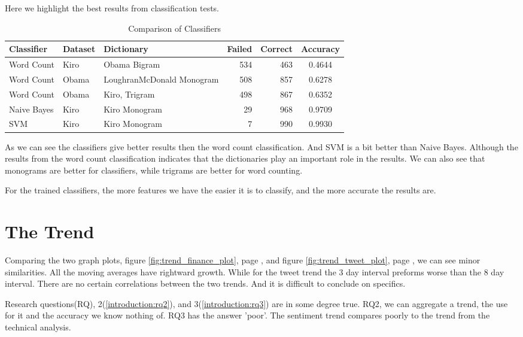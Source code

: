 \begin{table}
\centering
\label{tbl:classification_comparison}
\caption{Comparison of Classifiers}
Here we highlight the best results from classification tests. 
\begin{tabular}{ l l p{3.5cm} r r c }
Classifier & Dataset & Dictionary & Failed & Correct & Accuracy \\
\hline
Word Count & Kiro & Obama Bigram & 534 & 463 & 0.4644 \\
Word Count & Obama & LoughranMcDonald Monogram & 508 & 857 & 0.6278 \\
Word Count & Obama & Kiro, Trigram & 498 & 867 & 0.6352 \\
Naive Bayes & Kiro & Kiro Monogram & 29 & 968 & 0.9709 \\
SVM & Kiro & Kiro Monogram & 7 & 990 & 0.9930 \\
\end{tabular}
\end{table}

As we can see the classifiers give better results then the word count
classification. And SVM is a bit better than Naive Bayes. Although the results
from the word count classification indicates that the dictionaries play an
important role in the results. We can also see that monograms are better for
classifiers, while trigrams are better for word counting.

For the trained classifiers, the more
features we have the easier it is to classify, and the more accurate the
results are.
%

\section{The Trend}\label{results:trend}
Comparing the two graph plots, figure \ref{fig:trend_finance_plot}, page
\pageref{fig:trend_finance_plot}, and figure
\ref{fig:trend_tweet_plot}, page \pageref{fig:trend_tweet_plot}, we can see minor similarities. All the moving
averages have rightward growth. While for the tweet trend the 3 day interval
preforms worse than the 8 day interval. There are no certain correlations
between the two trends. And it is difficult to conclude on specifics. 

Research questions(RQ), 2(\ref{introduction:rq2}), and
3(\ref{introduction:rq3}) are in some degree true. RQ2, we can aggregate a
trend, the use for it and the accuracy we know nothing of. RQ3 has the
answer 'poor'. The sentiment trend compares poorly to the trend from the technical
analysis. 

